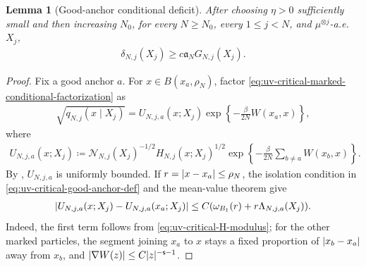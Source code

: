 \documentclass[11pt,reqno]{amsart}
\numberwithin{equation}{section}
\theoremstyle{plain}
\newtheorem{lemma}[lemma]{Lemma}
\theoremstyle{remark}
\DeclarePairedDelimiter{\pa}{\lparen}{\rparen}
\DeclarePairedDelimiter{\abs}{\lvert}{\rvert}
\newcommand{\be}{\beta}
\newcommand{\s}{\mathsf{s}}
\begin{document}
\begin{lemma}[Good-anchor conditional deficit]
\label{lem:uv-critical-good-anchor-deficit}
After choosing \(\eta>0\) sufficiently small and then increasing \(N_0\), for every \(N\ge N_0\), every \(1\le j<N\), and \(\mu^{\otimes j}\)-a.e. \(X_j\),
\begin{align}\label{eq:uv-critical-conditional-deficit-good-count}
 \delta_{N,j}(X_j)\ge c\mathfrak a_NG_{N,j}(X_j).
\end{align}
\end{lemma}

\begin{proof}
Fix a good anchor \(a\).  For \(x\in B(x_a,\rho_N)\), factor \eqref{eq:uv-critical-marked-conditional-factorization} as
\begin{align}\label{eq:uv-critical-sqrt-q-anchor-factorization}
 \sqrt{q_{N,j}(x\mid X_j)}
 =U_{N,j,a}(x;X_j)
 \exp\left\{-\frac\be{2N}W(x_a,x)\right\},
\end{align}
where
\begin{align}\label{eq:uv-critical-U-anchor-def}
 U_{N,j,a}(x;X_j)
 \coloneqq
 \mathcal N_{N,j}(X_j)^{-1/2}H_{N,j}(x;X_j)^{1/2}
 \exp\left\{-\frac\be{2N}\sum_{b\ne a}W(x_b,x)\right\}.
\end{align}
By , \(U_{N,j,a}\) is uniformly bounded.  If \(r=\abs{x-x_a}\le\rho_N\), the isolation condition in \eqref{eq:uv-critical-good-anchor-def} and the mean-value theorem give
\begin{align}\label{eq:uv-critical-U-anchor-modulus}
 \abs{U_{N,j,a}(x;X_j)-U_{N,j,a}(x_a;X_j)}
 \le C\pa{\omega_{B_1}(r)+r\Lambda_{N,j,a}(X_j)}.
\end{align}
Indeed, the first term follows from \eqref{eq:uv-critical-H-modulus}; for the other marked particles, the segment joining \(x_a\) to \(x\) stays a fixed proportion of \(\abs{x_b-x_a}\) away from \(x_b\), and \(\abs{\nabla W(z)}\le C\abs z^{-\s-1}\).


\end{proof}
\end{document}
